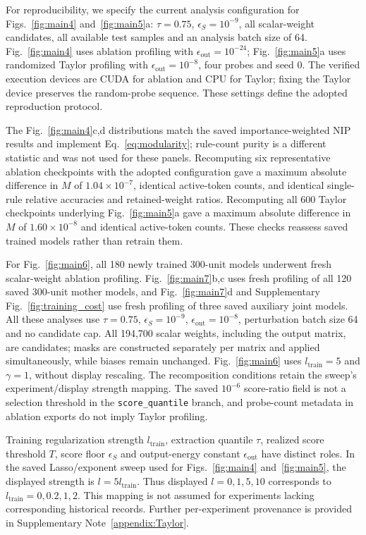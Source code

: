 \documentclass{article}
\begin{document}
For reproducibility, we specify the current analysis configuration for Figs.~\ref{fig:main4} and~\ref{fig:main5}a: $\tau=0.75$, $\epsilon_S=10^{-9}$, all scalar-weight candidates, all available test samples and an analysis batch size of 64. Fig.~\ref{fig:main4} uses ablation profiling with $\epsilon_{\mathrm{out}}=10^{-24}$; Fig.~\ref{fig:main5}a uses randomized Taylor profiling with $\epsilon_{\mathrm{out}}=10^{-8}$, four probes and seed 0. The verified execution devices are CUDA for ablation and CPU for Taylor; fixing the Taylor device preserves the random-probe sequence. These settings define the adopted reproduction protocol.

The Fig.~\ref{fig:main4}c,d distributions match the saved importance-weighted NIP results and implement Eq.~\eqref{eq:modularity}; rule-count purity is a different statistic and was not used for these panels. Recomputing six representative ablation checkpoints with the adopted configuration gave a maximum absolute difference in $M$ of $1.04\times10^{-7}$, identical active-token counts, and identical single-rule relative accuracies and retained-weight ratios. Recomputing all 600 Taylor checkpoints underlying Fig.~\ref{fig:main5}a gave a maximum absolute difference in $M$ of $1.60\times10^{-8}$ and identical active-token counts. These checks reassess saved trained models rather than retrain them.

For Fig.~\ref{fig:main6}, all 180 newly trained 300-unit models underwent fresh scalar-weight ablation profiling. Fig.~\ref{fig:main7}b,c uses fresh profiling of all 120 saved 300-unit mother models, and Fig.~\ref{fig:main7}d and Supplementary Fig.~\ref{fig:training_cost} use fresh profiling of three saved auxiliary joint models. All these analyses use $\tau=0.75$, $\epsilon_S=10^{-9}$, $\epsilon_{\mathrm{out}}=10^{-8}$, perturbation batch size 64 and no candidate cap. All 194,700 scalar weights, including the output matrix, are candidates; masks are constructed separately per matrix and applied simultaneously, while biases remain unchanged. Fig.~\ref{fig:main6} uses $l_{\mathrm{train}}=5$ and $\gamma=1$, without display rescaling. The recomposition conditions retain the sweep's experiment/display strength mapping. The saved $10^{-6}$ score-ratio field is not a selection threshold in the \texttt{score\_quantile} branch, and probe-count metadata in ablation exports do not imply Taylor profiling.

Training regularization strength $l_{\mathrm{train}}$, extraction quantile $\tau$, realized score threshold $T$, score floor $\epsilon_S$ and output-energy constant $\epsilon_{\mathrm{out}}$ have distinct roles. In the saved Lasso/exponent sweep used for Figs.~\ref{fig:main4} and~\ref{fig:main5}, the displayed strength is $l=5l_{\mathrm{train}}$. Thus displayed $l=0,1,5,10$ corresponds to $l_{\mathrm{train}}=0,0.2,1,2$. This mapping is not assumed for experiments lacking corresponding historical records. Further per-experiment provenance is provided in Supplementary Note~\ref{appendix:Taylor}.
\end{document}
